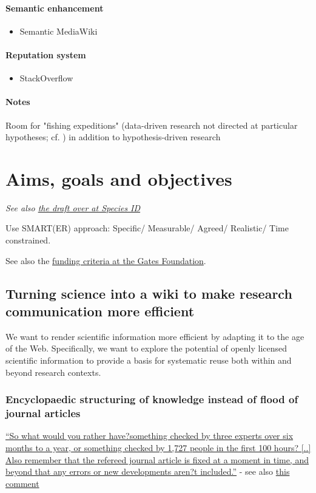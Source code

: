 \documentclass[final,authoryear,3p]{elsarticle-open-drafting}
\begin{document}
\paragraph{Semantic enhancement}
\begin{itemize}
	\item Semantic MediaWiki
\end{itemize}

\paragraph{Reputation system}
\begin{itemize}
	\item StackOverflow
\end{itemize}

\paragraph{Notes}
Room for "fishing expeditions" (data-driven research not directed at particular hypotheses; cf. \href{http://dx.doi.org/10.1091/mbc.E09}{\citep{botstein2010d}}) in addition to hypothesis-driven research

\section{Aims, goals and objectives}
{\it See also \href{http://species-id.net/wiki/Draft:Encyclopaedia_of_original_research#Aims,_Goals_and_Objectives}{the draft over at Species ID}}


Use SMART(ER) approach: 
Specific/ 
Measurable/ 
Agreed/ 
Realistic/ 
Time constrained.

See also the \href{http://www.gatesfoundation.org/grantseeker/Pages/how-we-make-grants.aspx}{funding criteria at the Gates Foundation}.

\subsection{Turning science into a wiki to make research communication more efficient}
We want to render scientific information more efficient by adapting it to the age of the Web. Specifically, we want to explore the potential of openly licensed scientific information to provide a basis for systematic reuse both within and beyond research contexts. 
\subsubsection{Encyclopaedic structuring of knowledge instead of flood of journal articles}
\href{http://nextbison.wordpress.com/2011/05/18/should-you-believe-wikipedia/}{``So what would you rather have?something checked by three experts over six months to a year, or something checked by 1,727 people in the first 100 hours?  [..]  Also remember that the refereed journal article is fixed at a moment in time, and beyond that any errors or new developments aren?t included.''} - see also \href{http://nextbison.wordpress.com/2011/05/18/should-you-believe-wikipedia/#comment-486}{this comment}
\end{document}

